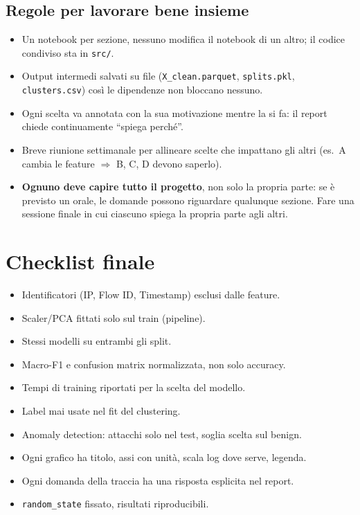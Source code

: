 \subsection{Regole per lavorare bene insieme}
\begin{itemize}
  \item Un notebook per sezione, nessuno modifica il notebook di un altro;
        il codice condiviso sta in \texttt{src/}.
  \item Output intermedi salvati su file (\texttt{X\_clean.parquet},
        \texttt{splits.pkl}, \texttt{clusters.csv}) così le dipendenze non
        bloccano nessuno.
  \item Ogni scelta va annotata con la sua motivazione mentre la si fa: il
        report chiede continuamente ``spiega perché''.
  \item Breve riunione settimanale per allineare scelte che impattano gli
        altri (es.\ A cambia le feature $\Rightarrow$ B, C, D devono saperlo).
  \item \textbf{Ognuno deve capire tutto il progetto}, non solo la propria
        parte: se è previsto un orale, le domande possono riguardare qualunque
        sezione. Fare una sessione finale in cui ciascuno spiega la propria
        parte agli altri.
\end{itemize}

\section{Checklist finale}
\begin{itemize}
  \item[$\square$] Identificatori (IP, Flow ID, Timestamp) esclusi dalle feature.
  \item[$\square$] Scaler/PCA fittati solo sul train (pipeline).
  \item[$\square$] Stessi modelli su entrambi gli split.
  \item[$\square$] Macro-F1 e confusion matrix normalizzata, non solo accuracy.
  \item[$\square$] Tempi di training riportati per la scelta del modello.
  \item[$\square$] Label mai usate nel fit del clustering.
  \item[$\square$] Anomaly detection: attacchi solo nel test, soglia scelta sul benign.
  \item[$\square$] Ogni grafico ha titolo, assi con unità, scala log dove serve, legenda.
  \item[$\square$] Ogni domanda della traccia ha una risposta esplicita nel report.
  \item[$\square$] \texttt{random\_state} fissato, risultati riproducibili.
\end{itemize}

\endgroup